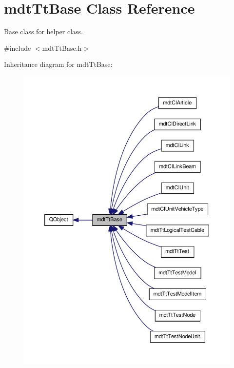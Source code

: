 \hypertarget{classmdt_tt_base}{\section{mdt\-Tt\-Base Class Reference}
\label{classmdt_tt_base}
}


Base class for helper class.  




{\ttfamily \#include $<$mdt\-Tt\-Base.\-h$>$}



Inheritance diagram for mdt\-Tt\-Base\-:
\nopagebreak
\begin{figure}[H]
\begin{center}
\leavevmode
\includegraphics[width=350pt]{classmdt_tt_base__inherit__graph}
\end{center}
\end{figure}


